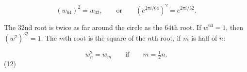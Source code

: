 \[(w_{64})^{2}=w_{32},\qquad\text{or}\qquad\left(e^{2\pi i/64}\right)^{2}=e^{2 \pi i/32}.\]

The \(32\)nd root is twice as far around the circle as the \(64\)th root. If \(w^{64}=1\), then \((w^{2})^{32}=1\). The \(m\)th root is the square of the \(n\)th root, if \(m\) is half of \(n\):

\[w_{n}^{2}=w_{m}\qquad\text{if}\qquad m=\tfrac{1}{2}n.\] (12) 